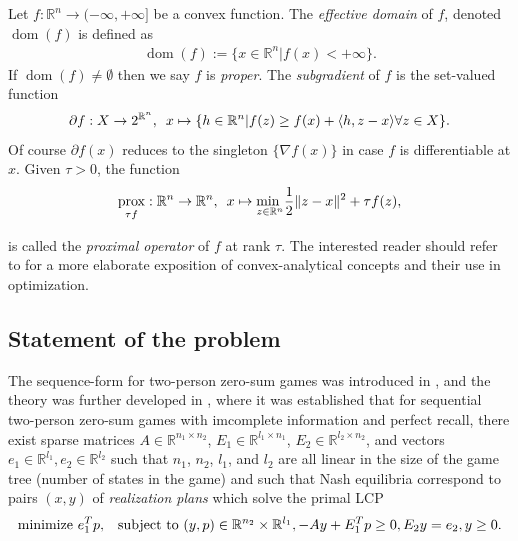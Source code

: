 \documentclass[envcountsame]{llcns2e/llncs}
\DeclareMathOperator{\dom}{dom}
\DeclareMathOperator{\prox}{prox}
\begin{document}
Let $f : \mathbb{R}^n \rightarrow (-\infty, +\infty]$ be a convex
  function.
The \textit{effective domain} of $f$, denoted $\dom(f)$ is defined as
\begin{eqnarray}
  \dom(f) := \{x \in \mathbb{R}^n | f(x) < +\infty\}.
\end{eqnarray}
 If $\dom(f) \ne \emptyset$ then we say $f$ is \textit{proper}.
The \textit{subgradient} of $f$ is the set-valued function
\begin{eqnarray}
\partial f: X \rightarrow 2^{\mathbb{R}^n}, \hspace{.5em} x \mapsto
\{h\in \mathbb{R}^n | f(z)  \ge f(x) + \langle h, z - x\rangle \forall
z \in X\}.
\end{eqnarray}
Of course $\partial f(x)$ reduces to the singleton $\{\nabla f(x)\}$
in case $f$ is differentiable at $x$. Given $\tau > 0$, the function
\begin{eqnarray}
  \prox_{\tau f}: \mathbb{R}^n \rightarrow \mathbb{R}^n,\hspace{.5em}x
  \mapsto \underset{z \in \mathbb{R}^n}{\text{min }}\frac{1}{2}\|z
  - x\|^2 + \tau f(z),
\end{eqnarray}

is called the \textit{proximal operator} of $f$ at rank $\tau$.
The interested reader should refer to
\cite{rockafellar1997convex,combettes2011proximal} for a more
elaborate exposition of convex-analytical concepts and their use in
optimization.

\subsection{Statement of the problem}
The sequence-form for two-person zero-sum games was introduced in
\cite{koller1992complexity}, and the theory was further developed in
\cite{koller1994fast,von1996efficient,vonequilibrium}, where it was
established that for sequential two-person zero-sum games with
imcomplete information and perfect recall, there exist sparse matrices
$A \in \mathbb{R}^{n_1
  \times n_2}$, $E_1 \in \mathbb{R}^{l_1 \times n_1}$, $E_2 \in
\mathbb{R}^{l_2 \times n_2}$, and vectors $e_1 \in \mathbb{R}^{l_1},
e_2 \in \mathbb{R}^{l_2}$ such that $n_1$, $n_2$, $l_1$, and $l_2$ are
all linear in the size of the game tree (number of states in the game)
and such that Nash equilibria correspond to pairs $(x, y)$ of
\textit{realization plans} which solve the primal LCP
\begin{equation}
  \begin{aligned}
     \text{minimize }e_1^Tp, \hspace{.5em}\text{ subject to }(y,p) \in
     \mathbb{R}^{n_2} \times \mathbb{R}^{l_1}, -Ay +
    E_1^Tp \geq 0, E_2y = e_2, y \ge 0.
  \end{aligned}
  \label{eq:primal_pb}
\end{equation}
\end{document}
